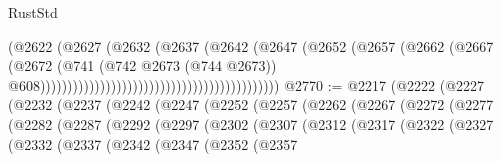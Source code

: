 \begin{lexlean}{RustStd}
\begin{coremodule}
{\begin{coremodule}
{{{{{{{{{{{{{{{{{{{{{{{{{{{{{{{{{{{{{{{{{{{{{                                                                    (@2622
                                                                      (@2627
                                                                        (@2632
                                                                          (@2637
                                                                            (@2642
                                                                              (@2647
                                                                                (@2652
                                                                                  (@2657
                                                                                    (@2662
                                                                                      (@2667
                                                                                        (@2672
                                                                                          (@741
                                                                                            (@742
                                                                                              @2673
                                                                                              (@744
                                                                                                @2673))
                                                                                            @608))))))))))))))))))))))))))))))))))))))))))))
@2770 := @2217
    (@2222
      (@2227
        (@2232
          (@2237
            (@2242
              (@2247
                (@2252
                  (@2257
                    (@2262
                      (@2267
                        (@2272
                          (@2277
                            (@2282
                              (@2287
                                (@2292
                                  (@2297
                                    (@2302
                                      (@2307
                                        (@2312
                                          (@2317
                                            (@2322
                                              (@2327
                                                (@2332
                                                  (@2337
                                                    (@2342
                                                      (@2347
                                                        (@2352
                                                          (@2357
}}}}}}}}}}}}}}}}}}}}}}}}}}}}}}}}}}}}}}}}}}}}}
\end{coremodule}}
\end{coremodule}
\end{lexlean}
